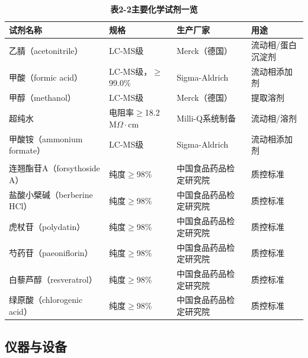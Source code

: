 \documentclass[12pt,a4paper,UTF8,openany]{ctexbook}
\begin{document}
\begin{table}[H]
\centering
\caption{\textbf{表2-2\enspace 主要化学试剂一览}}
\label{tab:reagents}
\small
\begin{tabularx}{\textwidth}{>{\raggedright\arraybackslash}p{3.5cm} >{\centering\arraybackslash}p{2.0cm} >{\raggedright\arraybackslash}p{2.5cm} >{\raggedright\arraybackslash}X}
\toprule
\textbf{试剂名称} & \textbf{规格} & \textbf{生产厂家} & \textbf{用途} \\
\midrule
乙腈（acetonitrile） & LC-MS级 & Merck（德国） & 流动相/蛋白沉淀剂 \\
甲酸（formic acid） & LC-MS级，$\geq$99.0\% & Sigma-Aldrich & 流动相添加剂 \\
甲醇（methanol） & LC-MS级 & Merck（德国） & 提取溶剂 \\
超纯水 & 电阻率$\geq$18.2 M$\Omega\cdot$cm & Milli-Q系统制备 & 流动相/溶剂 \\
甲酸铵（ammonium formate）& LC-MS级 & Sigma-Aldrich & 流动相添加剂 \\
\midrule
\multicolumn{4}{l}{\textbf{对照品（标准品）}} \\
\midrule
连翘酯苷A（forsythoside A） & 纯度$\geq$98\% & 中国食品药品检定研究院 & 质控标准 \\
盐酸小檗碱（berberine HCl） & 纯度$\geq$98\% & 中国食品药品检定研究院 & 质控标准 \\
虎杖苷（polydatin） & 纯度$\geq$98\% & 中国食品药品检定研究院 & 质控标准 \\
芍药苷（paeoniflorin） & 纯度$\geq$98\% & 中国食品药品检定研究院 & 质控标准 \\
白藜芦醇（resveratrol） & 纯度$\geq$98\% & 中国食品药品检定研究院 & 质控标准 \\
绿原酸（chlorogenic acid） & 纯度$\geq$98\% & 中国食品药品检定研究院 & 质控标准 \\
\bottomrule
\end{tabularx}
\end{table}

\subsection{仪器与设备}
\end{document}
